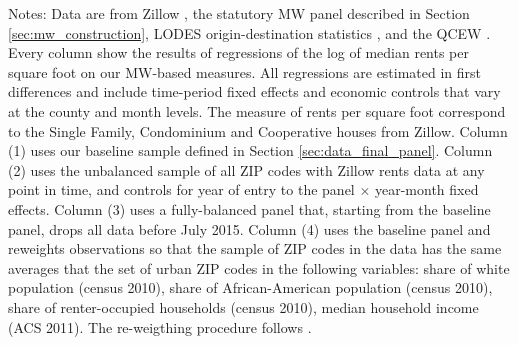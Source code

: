 \begin{table}[hbt!]
    \begin{minipage}{.95\textwidth} \footnotesize
        \vspace{2mm}
        Notes:
        Data are from Zillow \parencite{ZillowData}, 
        the statutory MW panel described in Section \ref{sec:mw_construction}, 
        LODES origin-destination statistics \parencite{CensusLODES},
        and the QCEW \parencite{QCEW}.
        Every column show the results of regressions of the log of 
        median rents per square foot on our MW-based measures.
        All regressions are estimated in first differences and include 
        time-period fixed effects and economic controls that vary at the 
        county and month levels.
        The measure of rents per square foot correspond to the Single Family, 
        Condominium and Cooperative houses from Zillow.
        Column (1) uses our baseline sample defined in Section 
        \ref{sec:data_final_panel}.
        Column (2) uses the unbalanced sample of all ZIP codes with Zillow rents 
        data at any point in time, and controls for year of entry to the panel
        $\times$ year-month fixed effects.
        Column (3) uses a fully-balanced panel that, starting from the baseline
        panel, drops all data before July 2015.
        Column (4) uses the baseline panel and reweights observations so that 
        the sample of ZIP codes in the data has the same averages that the set 
        of urban ZIP codes in the following variables:
        share of white population (census 2010), 
        share of African-American population (census 2010),
        share of renter-occupied households (census 2010),
        median household income (ACS 2011).
        The re-weigthing procedure follows \textcite{Hainmueller2012}.
    \end{minipage}
\end{table}
